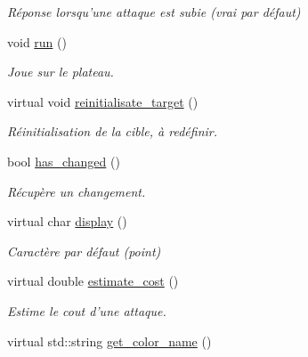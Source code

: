 \begin{DoxyCompactItemize}
\begin{DoxyCompactList}\small\item\em Réponse lorsqu'une attaque est subie (vrai par défaut) \end{DoxyCompactList}\item 
void \hyperlink{classVirtual__planet_aa063b164739842ba1c95018e24b122d5}{run} ()
\begin{DoxyCompactList}\small\item\em Joue sur le plateau. \end{DoxyCompactList}\item 
\hypertarget{classVirtual__planet_a3294db05abde3781e5ed0625d5e094a6}{virtual void \hyperlink{classVirtual__planet_a3294db05abde3781e5ed0625d5e094a6}{reinitialisate\-\_\-target} ()}\label{classVirtual__planet_a3294db05abde3781e5ed0625d5e094a6}

\begin{DoxyCompactList}\small\item\em Réinitialisation de la cible, à redéfinir. \end{DoxyCompactList}\item 
bool \hyperlink{classVirtual__planet_ab47d3e56b68242189b6df870d45c5157}{has\-\_\-changed} ()
\begin{DoxyCompactList}\small\item\em Récupère un changement. \end{DoxyCompactList}\item 
\hypertarget{classVirtual__planet_affaf5157ca3fb7e3d5c9fac1736578a3}{virtual char \hyperlink{classVirtual__planet_affaf5157ca3fb7e3d5c9fac1736578a3}{display} ()}\label{classVirtual__planet_affaf5157ca3fb7e3d5c9fac1736578a3}

\begin{DoxyCompactList}\small\item\em Caractère par défaut (point) \end{DoxyCompactList}\item 
\hypertarget{classVirtual__planet_a7f442fee301927b27217877abb765833}{virtual double \hyperlink{classVirtual__planet_a7f442fee301927b27217877abb765833}{estimate\-\_\-cost} ()}\label{classVirtual__planet_a7f442fee301927b27217877abb765833}

\begin{DoxyCompactList}\small\item\em Estime le cout d'une attaque. \end{DoxyCompactList}\item 
\hypertarget{classVirtual__planet_a84cba41f0fa06d0512ea462a26b972e3}{virtual std\-::string \hyperlink{classVirtual__planet_a84cba41f0fa06d0512ea462a26b972e3}{get\-\_\-color\-\_\-name} ()}\label{classVirtual__planet_a84cba41f0fa06d0512ea462a26b972e3}


\end{DoxyCompactItemize}
